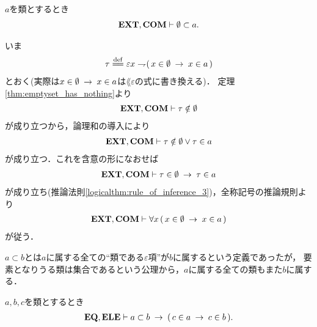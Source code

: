 	\begin{screen}
		\begin{thm}[空集合は全ての類に含まれる]
		\label{thm:emptyset_if_a_subset_of_every_class}
			$a$を類とするとき
			\begin{align}
				\mbox{{\bf EXT}},\mbox{\bf COM} \vdash \emptyset \subset a.
			\end{align}
		\end{thm}
	\end{screen}
	
	\begin{prf}
		いま
		\begin{align}
			\tau \defeq \varepsilon x \negation (\, x \in \emptyset \rarrow x \in a\, )
		\end{align}
		とおく(実際は$x \in \emptyset \hspace{0.25em}\rightarrow\hspace{0.25em} x \in a$は$\lang{\varepsilon}$の式に書き換える)．
		定理\ref{thm:emptyset_has_nothing}より
		\begin{align}
			\mbox{{\bf EXT}},\mbox{\bf COM} \vdash \tau \notin \emptyset
		\end{align}
		が成り立つから，論理和の導入により
		\begin{align}
			\mbox{{\bf EXT}},\mbox{\bf COM} \vdash \tau \notin \emptyset \vee \tau \in a
		\end{align}
		が成り立つ．これを含意の形になおせば
		\begin{align}
			\mbox{{\bf EXT}},\mbox{\bf COM} \vdash \tau \in \emptyset \hspace{0.25em}\rightarrow\hspace{0.25em} \tau \in a
		\end{align}
		が成り立ち(推論法則\ref{logicalthm:rule_of_inference_3})，全称記号の推論規則より
		\begin{align}
			\mbox{{\bf EXT}},\mbox{\bf COM} \vdash \forall x\, (\, x \in \emptyset \hspace{0.25em}\rightarrow\hspace{0.25em} x \in a\, )
		\end{align}
		が従う．
		\QED
	\end{prf}
	
	$a \subset b$とは$a$に属する全ての``類である$\varepsilon$項''が$b$に属するという定義であったが，
	要素となりうる類は集合であるという公理から，$a$に属する全ての類もまた$b$に属する．
	
	\begin{screen}
		\begin{thm}[類はその部分類に属する全ての類を要素に持つ]
		\label{thm:subclass_contains_all_elements}
			$a,b,c$を類とするとき
			\begin{align}
				\mbox{{\bf EQ}},\mbox{{\bf ELE}} \vdash 
				a \subset b \hspace{0.25em}\rightarrow\hspace{0.25em} (\, c \in a \hspace{0.25em}\rightarrow\hspace{0.25em} c \in b\, ).
			\end{align}
		\end{thm}
	\end{screen}
	
